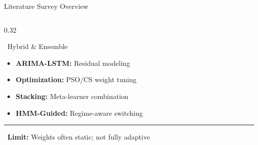 \documentclass{beamer}
\begin{document}
\begin{frame}[label=lit_overview]{Literature Survey Overview}
\begin{columns}[T]
\begin{column}{0.32\textwidth}
\begin{orangecard}{~Hybrid \& Ensemble}
\scriptsize
\begin{itemize}\setlength\itemsep{1.5pt}
\item \textbf{ARIMA-LSTM:} Residual modeling
\item \textbf{Optimization:} PSO/CS weight tuning
\item \textbf{Stacking:} Meta-learner combination
\item \textbf{HMM-Guided:} Regime-aware switching
\end{itemize}
\vspace{0.06cm}
\hrule
\vspace{0.08cm}
{\tiny\color{accentred}~\textbf{Limit:} Weights often static; not fully adaptive}
\end{orangecard}
\end{column}

\end{columns}

\end{frame}
\end{document}
